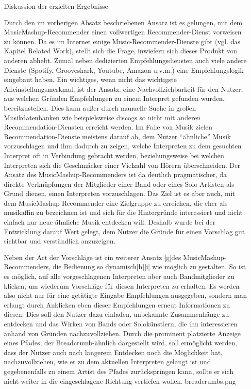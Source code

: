 Diskussion der erzielten Ergebnisse

Durch den im vorherigen Absatz beschriebenen Ansatz ist es gelungen, mit dem MusicMashup-Recommender einen vollwertigen Recommender-Dienst vorweisen zu können. Da es im Internet einige Music-Recommender-Dienste gibt (vgl. das Kapitel Related Work), stellt sich die Frage, inwiefern sich dieses Produkt von anderen abhebt. Zumal neben dedizierten Empfehlungsdiensten auch viele andere Dienste (Spotify, Grooveshark, Youtube, Amazon u.v.m.)  eine Empfehlungslogik eingebaut haben.
Ein wichtiges, wenn nicht das wichtigste Alleinstellungsmerkmal, ist der Ansatz, eine Nachvollziehbarkeit für den Nutzer, aus welchen Gründen Empfehlungen zu einem Interpret gefunden wurden, bereitzustellen. Dies kann außer durch manuelle Suche in großen Musikdatenbanken wie beispielsweise discogs so nicht mit anderen Recommendation-Diensten erreicht werden.
Im Falle von Musik zielen Recommendation-Dienste meistens darauf ab, dem Nutzer “ähnliche” Musik vorzuschlagen und ihm dadurch zu zeigen, welche Interpreten zu dem gesuchten Interpret oft in Verbindung gebracht werden, beziehungsweise bei welchen Interpreten sich die Geschmäcker einer Vielzahl von Hörern überschneiden.
Der Ansatz des MusicMashup-Recommenders ist da deutlich pragmatischer, da direkte Verknüpfungen der Mitglieder einer Band oder eines Solo-Artisten als Grund dienen, einen Interpreten vorzuschlagen.
Das Ziel ist es aber auch, mit dem MusicMashup-Recommender eine Zielgruppe zu erreichen, die eher als musikaffin zu bezeichnen ist und sich für die Hintergründe interessiert und nicht einfach nur neue ähnliche Musik entdecken will. Deshalb wurde bei der Entwicklung darauf Wert gelegt, dem Nutzer die Gründe für einen Vorschlag gut sichtbar und verständlich anzuzeigen.

Neben der Art der Vorschläge ist ein weiterer Ansatz [g]des MusicMashup-Recommenders, die Bedienung so dynamisch[h][i] wie möglich zu gestalten. So ist es möglich, auf alle vorgeschlagenen Interpreten aber auch Bandmitglieder zu klicken, um wiederum Vorschläge für diesen Interpreten zu erhalten. Es werden also nicht nur für eine getätigte Eingabe Empfehlungen ausgegeben, sondern man erlangt durch Anklicken eben dieser Empfehlungen erneut Informationen zu diesen. Dies soll den Nutzer dazu einladen, unbekannte Zusammenhänge zu entdecken und das Wirken von Bands oder Solokünstlern, die ihn interessieren anhand von Gründen nachzuvollziehen. Durch die prominent platzierte Anzeige eines Pfades, der Breadcrumb-ähnlich dargestellt wird, soll ermöglicht werden, dass der Nutzer auch nach längerem Entdecken noch die Möglichkeit hat, nachzuvollziehen, wie er zu dem aktuellen Interpreten gelangt ist und gegebenenfalls zu einem Artist des Pfades zurückspringen kann, sollte er sich nicht weiter in die eingeschlagene Richtung vertiefen wollen.
 breadcrumbs.png 

